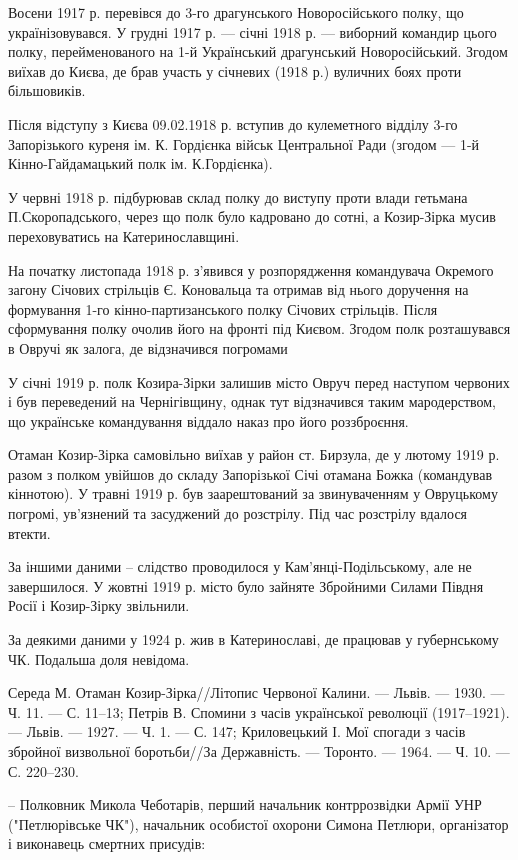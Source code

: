 Восени 1917 р. перевівся до 3-го драгунського Новоросійського полку, що
українізовувався. У грудні 1917 р. — січні 1918 р. — виборний командир цього
полку, перейменованого на 1-й Український драгунський Новоросійський. Згодом
виїхав до Києва, де брав участь у січневих (1918 р.) вуличних боях проти
більшовиків. 

Після відступу з Києва 09.02.1918 р. вступив до кулеметного відділу 3-го
Запорізького куреня ім. К. Гордієнка військ Центральної Ради (згодом — 1-й
Кінно-Гайдамацький полк ім. К.Гордієнка). 

У червні 1918 р. підбурював склад полку до виступу проти влади гетьмана
П.Скоропадського, через що полк було кадровано до сотні, а Козир-Зірка мусив
переховуватись на Катеринославщині. 

На початку листопада 1918 р. з'явився у розпорядження командувача Окремого
загону Січових стрільців Є. Коновальца та отримав від нього доручення на
формування 1-го кінно-партизанського полку Січових стрільців. Після
сформування полку очолив його на фронті під Києвом. Згодом полк розташувався
в Овручі як залога, де відзначився погромами

У січні 1919 р. полк Козира-Зірки залишив місто Овруч перед наступом червоних і
був переведений на Чернігівщину, однак тут відзначився таким мародерством, що
українське командування віддало наказ про його роззброєння. 

Отаман Козир-Зірка самовільно виїхав у район ст. Бирзула, де у лютому 1919 р.
разом з полком увійшов до складу Запорізької Січі отамана Божка (командував
кіннотою). У травні 1919 р. був заарештований за звинуваченням у Овруцькому
погромі, ув'язнений та засуджений до розстрілу. Під час розстрілу вдалося
втекти. 

За іншими даними – слідство проводилося у Кам'янці-Подільському, але не
завершилося. У жовтні 1919 р. місто було зайняте Збройними Силами Півдня
Росії і Козир-Зірку звільнили.

За деякими даними у 1924 р. жив в Катеринославі, де працював у губернському ЧК. Подальша доля невідома.

Середа М. Отаман Козир-Зірка//Літопис Червоної Калини. — Львів. — 1930. — Ч.
11. — С. 11–13; Петрів В. Спомини з часів української революції (1917–1921). —
Львів. — 1927. — Ч. 1. — С. 147; Криловецький І. Мої спогади з часів збройної
визвольної боротьби//За Державність. — Торонто. — 1964. — Ч. 10. — С. 220–230.

\zzrule

– Полковник Микола Чеботарів, перший начальник контррозвідки Армії УНР
("Петлюрівське ЧК"), начальник особистої охорони Симона Петлюри, організатор і
виконавець смертних присудів:

